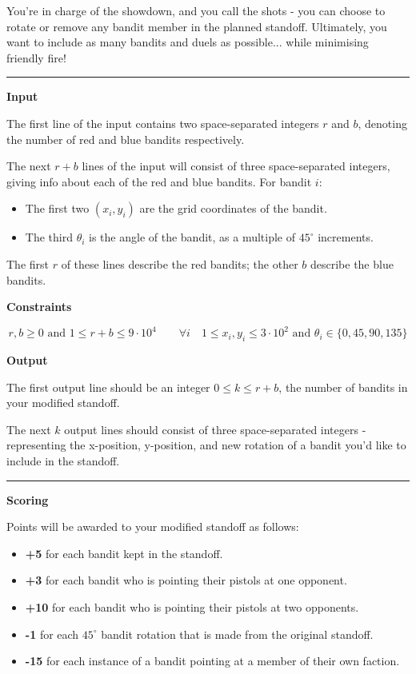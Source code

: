 You're in charge of the showdown, and you call the shots - you can choose to rotate or remove any bandit member in the planned standoff.
Ultimately, you want to include as many bandits and duels as possible... while minimising friendly fire!

\vspace{8pt}
\hrule

\textbf{Input}

The first line of the input contains two space-separated integers $r$ and $b$, denoting the number of red and blue bandits respectively.

The next $r + b$ lines of the input will consist of three space-separated integers, giving info about each of the red and blue bandits. For bandit $i$:
\begin{itemize}
    \item The first two $(x_i,y_i)$ are the grid coordinates of the bandit.
    \item The third $\theta_i$ is the angle of the bandit, as a multiple of $45^\circ$ increments.
\end{itemize}
The first $r$ of these lines describe the red bandits; the other $b$ describe the blue bandits.

\textbf{Constraints}

\begin{equation*}
    r, b \geq 0 \text{ and } 1 \leq r+b \leq 9 \cdot 10^4 \qquad \forall i \quad 1 \leq x_i,y_i \leq 3 \cdot 10^2 \text{ and } \theta_i \in \{0, 45, 90, 135\}
\end{equation*}

\textbf{Output}

The first output line should be an integer $0 \leq k \leq r + b$, the number of bandits in your modified standoff.

The next $k$ output lines should consist of three space-separated integers - representing the x-position, y-position, and new rotation of a bandit you'd like to include in the standoff.

\vspace{8pt}
\hrule

\textbf{Scoring}

Points will be awarded to your modified standoff as follows:
\begin{itemize}
    \item \textbf{+5} for each bandit kept in the standoff.
    \item \textbf{+3} for each bandit who is pointing their pistols at one opponent.
    \item \textbf{+10} for each bandit who is pointing their pistols at two opponents.
    \item \textbf{-1} for each $45^\circ$ bandit rotation that is made from the original standoff.
    \item \textbf{-15} for each instance of a bandit pointing at a member of their own faction.
\end{itemize}

